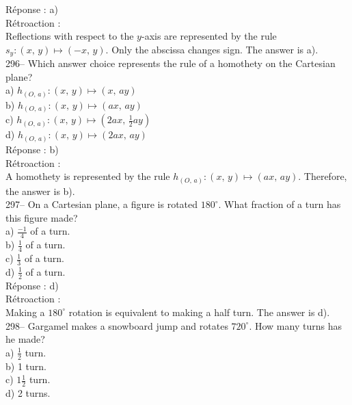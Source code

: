\documentclass[letterpaper, 12pt]{article}
\begin{document}
R\'eponse : a)\\

R\'etroaction : \\
Reflections with respect to the $y$-axis are represented by the rule
$s_y :\left( x,\,y\right) \longmapsto \left(-x,\,y\right)$. Only the
abscissa changes sign. The answer is a).\\

296-- Which answer choice represents the rule of a homothety on the
Cartesian plane?\\

a) $h_{\left( O,\,a\right)} :\left( x,\,y\right) \longmapsto
\left(x,\,ay\right) $ \\
b) $h_{\left( O,\,a\right)} :\left( x,\,y\right) \longmapsto
\left(ax,\,ay\right) $ \\
c) $h_{\left( O,\,a\right)} :\left( x,\,y\right) \longmapsto
\left(2ax,\,\frac{1}{2}ay\right) $ \\
d) $h_{\left( O,\,a\right)} :\left( x,\,y\right) \longmapsto
\left(2ax,\,ay\right) $ \\

R\'eponse : b)\\

R\'etroaction : \\
A homothety is represented by the rule $h_{\left( O,\,a\right)}
:\left(
x,\,y\right) \longmapsto \left(ax,\,ay\right)$. Therefore, the answer is b).\\


297-- On a Cartesian plane, a figure is rotated
$180^{\circ}$.  What fraction of a turn has this figure made?\\

a) $\frac{-1}{4}$ of a turn.\\[2mm]
b) $\frac{1}{4}$ of a turn.\\[2mm]
c) $\frac{1}{3}$ of a turn.\\[2mm]
d) $\frac{1}{2}$ of a turn.\\

R\'eponse : d)\\

R\'etroaction : \\
Making a $180^{\circ}$ rotation is equivalent to making a half
turn. The answer is d).\\

298--  Gargamel makes a snowboard jump and rotates
$720^{\circ}$. How many turns has he made?\\

a) $\frac{1}{2}$ turn.\\[2mm]
b) 1 turn.\\[2mm]
c) $1\frac{1}{2}$ turn.\\[2mm]
d) 2 turns.\\
\end{document}
